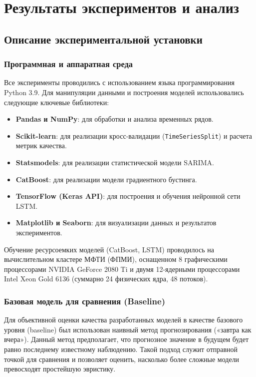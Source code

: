 \chapter{Результаты экспериментов и анализ}
\label{ch:results}

\section{Описание экспериментальной установки}
\label{sec:exp_setup}

\subsection{Программная и аппаратная среда}

Все эксперименты проводились с использованием языка программирования Python 3.9. Для манипуляции данными и построения моделей использовались следующие ключевые библиотеки:
\begin{itemize}
    \item \textbf{Pandas и NumPy}: для обработки и анализа временных рядов.
    \item \textbf{Scikit-learn}: для реализации кросс-валидации (\texttt{TimeSeriesSplit}) и расчета метрик качества.
    \item \textbf{Statsmodels}: для реализации статистической модели SARIMA.
    \item \textbf{CatBoost}: для реализации модели градиентного бустинга.
    \item \textbf{TensorFlow (Keras API)}: для построения и обучения нейронной сети LSTM.
    \item \textbf{Matplotlib и Seaborn}: для визуализации данных и результатов экспериментов.
\end{itemize}

Обучение ресурсоемких моделей (CatBoost, LSTM) проводилось на вычислительном кластере МФТИ (ФПМИ), оснащенном 8 графическими процессорами NVIDIA GeForce 2080 Ti и двумя 12-ядерными процессорами Intel Xeon Gold 6136 (суммарно 24 физических ядра, 48 потоков).

\subsection{Базовая модель для сравнения (Baseline)}

Для объективной оценки качества разработанных моделей в качестве базового уровня (baseline) был использован наивный метод прогнозирования («завтра как вчера»). Данный метод предполагает, что прогнозное значение в будущем будет равно последнему известному наблюдению. Такой подход служит отправной точкой для сравнения и позволяет оценить, насколько более сложные модели превосходят простейшую эвристику.

